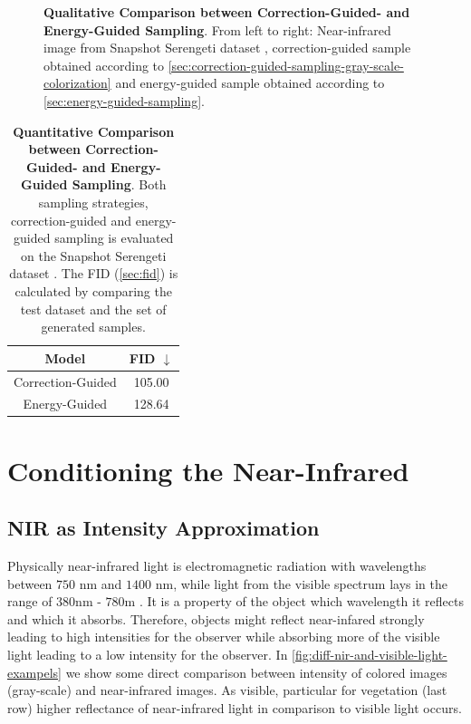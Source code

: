 \begin{figure}[htp!]
\begin{tabularx}{\textwidth}{Y Y Y !{\space} Y Y Y}
    \end{tabularx}
    \caption{
        \textbf{Qualitative Comparison between Correction-Guided- and Energy-Guided Sampling}.
        From left to right:
        Near-infrared image from Snapshot Serengeti dataset \parencite{serengeti},
        correction-guided sample obtained according to \autoref{sec:correction-guided-sampling-gray-scale-colorization}
        and
        energy-guided sample obtained according to \autoref{sec:energy-guided-sampling}.
    }
    \label{fig:qualitative-evaluation-loss-guided-vs-correction-guided}
\end{figure}

\begin{table}[htp!]
    \centering
    \begin{tabular}{c | c}
        Model             & FID  $\downarrow$ \\
        \hline\hline
        Correction-Guided & 105.00            \\
        Energy-Guided     & 128.64
    \end{tabular}
    \caption{
        \textbf{Quantitative Comparison between Correction-Guided- and Energy-Guided Sampling}.
        Both sampling strategies, correction-guided and energy-guided sampling is evaluated on the Snapshot Serengeti dataset \parencite{serengeti}.
        The FID (\autoref{sec:fid}) \parencite{ttur} is calculated by comparing the test dataset and the set of generated samples.
    }
    \label{fig:quantitative-evaluation-loss-guided-vs-correction-guided}
\end{table}



\section{Conditioning the Near-Infrared}
\subsection{NIR as Intensity Approximation}
\label{sec:nir-as-intensity-approximation-evaluation}
Physically near-infrared light is electromagnetic radiation with wavelengths between $750$ nm and $1400$ nm, while light from the visible spectrum lays in the range of $380$nm - $780$m \parencite{ISO.20473:2007}.
It is a property of the object which wavelength it reflects and which it absorbs.
Therefore, objects might reflect near-infared strongly leading to high intensities for the observer while absorbing more of the visible light leading to a low intensity for the observer.
In \autoref{fig:diff-nir-and-visible-light-exampels} we show some direct comparison between intensity of colored images (gray-scale) and near-infrared images.
As visible, particular for vegetation (last row) higher reflectance of near-infrared light in comparison to visible light occurs.



